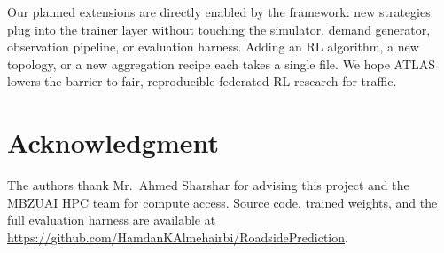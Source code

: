 \documentclass[conference]{IEEEtran}
\begin{document}
Our planned extensions are directly enabled by the framework: new strategies plug into the trainer layer without touching the simulator, demand generator, observation pipeline, or evaluation harness. Adding an RL algorithm, a new topology, or a new aggregation recipe each takes a single file. We hope ATLAS lowers the barrier to fair, reproducible federated-RL research for traffic.

\section*{Acknowledgment}
The authors thank Mr.~Ahmed Sharshar for advising this project and the MBZUAI HPC team for compute access. Source code, trained weights, and the full evaluation harness are available at \url{https://github.com/HamdanKAlmehairbi/RoadsidePrediction}.
\end{document}

